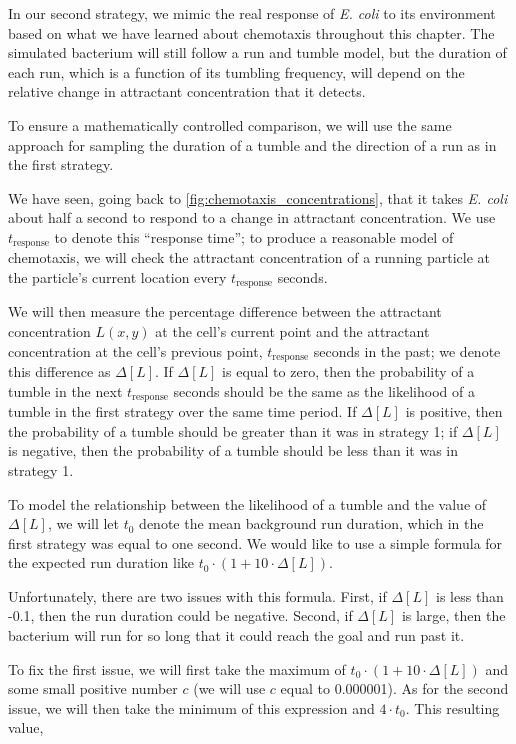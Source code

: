 In our second strategy, we mimic the real response of \textit{E. coli} to its environment based on what we have learned about chemotaxis throughout this chapter. The simulated bacterium will still follow a run and tumble model, but the duration of each run, which is a function of its tumbling frequency, will depend on the relative change in attractant concentration that it detects.

To ensure a mathematically controlled comparison, we will use the same approach for sampling the duration of a tumble and the direction of a run as in the first strategy.

We have seen, going back to \autoref{fig:chemotaxis_concentrations}, that it takes \textit{E. coli} about half a second to respond to a change in attractant concentration. We use $t_{\text{response}}$ to denote this ``response time''; to produce a reasonable model of chemotaxis, we will check the attractant concentration of a running particle at the particle's current location every $t_{\text{response}}$ seconds.

We will then measure the percentage difference between the attractant concentration $L(x,y)$ at the cell's current point and the attractant concentration at the cell's previous point, $t_{\text{response}}$ seconds in the past; we denote this difference as $\Delta[L]$. If $\Delta[L]$ is equal to zero, then the probability of a tumble in the next $t_{\text{response}}$ seconds should be the same as the likelihood of a tumble in the first strategy over the same time period. If $\Delta[L]$ is positive, then the probability of a tumble should be greater than it was in strategy 1; if $\Delta[L]$ is negative, then the probability of a tumble should be less than it was in strategy 1.

To model the relationship between the likelihood of a tumble and the value of $\Delta[L]$, we will let $t_0$ denote the mean background run duration, which in the first strategy was equal to one second. We would like to use a simple formula for the expected run duration like $t_0 \cdot (1 + 10 \cdot \Delta[L])$.

Unfortunately, there are two issues with this formula. First, if $\Delta[L]$ is less than -0.1, then the run duration could be negative. Second, if $\Delta[L]$ is large, then the bacterium will run for so long that it could reach the goal and run past it.

To fix the first issue, we will first take the maximum of $t_0 \cdot (1 + 10 \cdot \Delta [L])$ and some small positive number $c$ (we will use $c$ equal to 0.000001). As for the second issue, we will then take the minimum of this expression and $4 \cdot t_0$. This resulting value,

